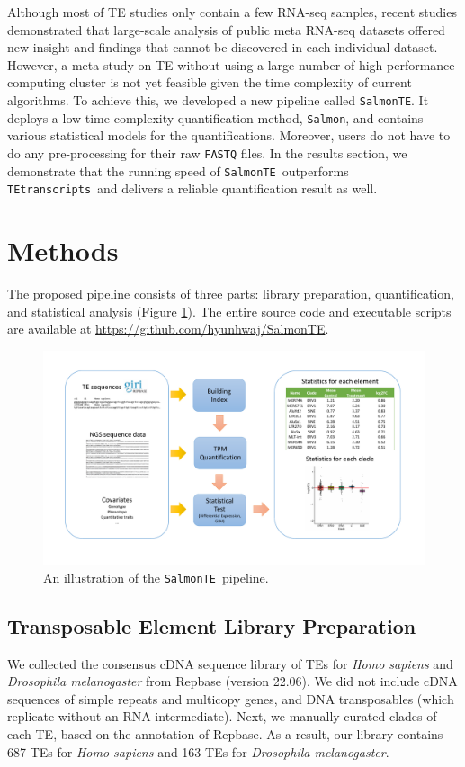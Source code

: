\documentclass[wsdraft]{ws-procs11x85}
\newcommand{\TEtranscripts}{\texttt{TEtranscripts}}
\newcommand{\SalmonTE}{\texttt{SalmonTE}}
\begin{document}
Although most of TE studies only contain a few RNA-seq samples, recent studies demonstrated that large-scale analysis of public meta RNA-seq datasets offered new insight and findings that cannot be discovered in each individual dataset. \cite{nellore2016human} However, a meta study on TE without using a large number of high performance computing cluster is not yet feasible given the time complexity of current algorithms.  To achieve this, we developed a new pipeline called \SalmonTE. It deploys a low time-complexity quantification method, \verb|Salmon|\cite{patro2017salmon}, and contains various statistical models for the quantifications. Moreover, users do not have to do any pre-processing for their raw \verb|FASTQ| files. 
In the results section, we demonstrate that the running speed of  \SalmonTE~outperforms \TEtranscripts~and delivers a reliable quantification result as well.

\section{Methods}

The proposed pipeline consists of three parts: library preparation, quantification, and statistical analysis (Figure \ref{aba:fig1}). 
The entire source code and executable scripts are available at \url{https://github.com/hyunhwaj/SalmonTE}. 

\begin{figure}[b]
\centerline{
\includegraphics[width=14cm]{fig1.pdf}
}
\caption{An illustration of the \SalmonTE~pipeline.}
\label{aba:fig1}
\end{figure}

\subsection{Transposable Element Library Preparation}
We collected the consensus cDNA sequence library of TEs for \textit{Homo sapiens} and \textit{Drosophila melanogaster} from Repbase   (version 22.06)\cite{repbase}. We did not include cDNA sequences of simple repeats and multicopy genes, and DNA transposables (which replicate without an RNA intermediate).  Next, we manually curated clades of each TE, based on the annotation of Repbase. As a result, our library contains 687 TEs for \textit{Homo sapiens} and 163 TEs for \textit{Drosophila melanogaster}.
\end{document}
